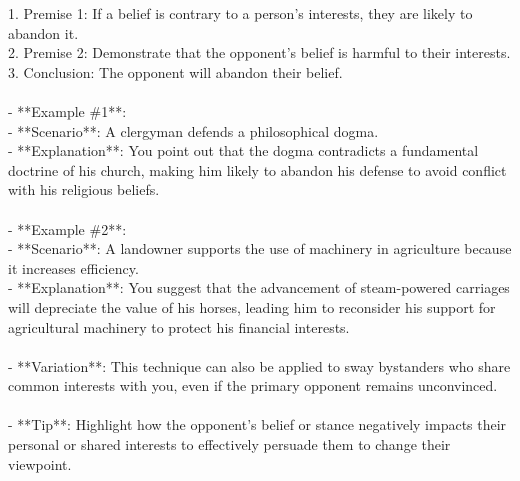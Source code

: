 \documentclass[a4paper,12pt,single,pdftex]{scrartcl}
\begin{document}
    
        1. Premise 1: If a belief is contrary to a person's interests, they are likely to abandon it.
    \\

    
        2. Premise 2: Demonstrate that the opponent's belief is harmful to their interests.
    \\

    
        3. Conclusion: The opponent will abandon their belief.
    \\

    
      
    \\

    
      - **Example \#1**:
    \\

    
        - **Scenario**: A clergyman defends a philosophical dogma.
    \\

    
        - **Explanation**: You point out that the dogma contradicts a fundamental doctrine of his church, making him likely to abandon his defense to avoid conflict with his religious beliefs.
    \\

    
      
    \\

    
      - **Example \#2**:
    \\

    
        - **Scenario**: A landowner supports the use of machinery in agriculture because it increases efficiency.
    \\

    
        - **Explanation**: You suggest that the advancement of steam-powered carriages will depreciate the value of his horses, leading him to reconsider his support for agricultural machinery to protect his financial interests.
    \\

    
      
    \\

    
      - **Variation**: This technique can also be applied to sway bystanders who share common interests with you, even if the primary opponent remains unconvinced.
    \\

    
      
    \\

    
      - **Tip**: Highlight how the opponent’s belief or stance negatively impacts their personal or shared interests to effectively persuade them to change their viewpoint.
    \\
\end{document}
